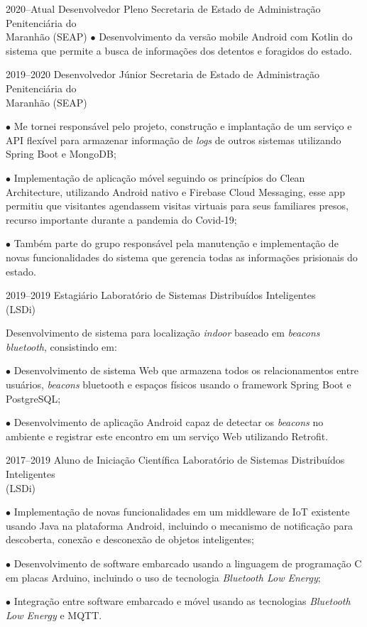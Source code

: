 \documentclass[]{../document-class/twentysecondcv}
\begin{document}
\begin{twenty}
	\twentyitem
		{2020--Atual}
		{Desenvolvedor Pleno}
		{Secretaria de Estado de Administração Penitenciária do \\\hspace*{\fill}Maranhão (SEAP)}
		{
			$\bullet$ Desenvolvimento da versão mobile Android com Kotlin do sistema que permite a busca de informações dos detentos e foragidos do estado.
		}

	\twentyitem
		{2019--2020}
		{Desenvolvedor Júnior}
		{Secretaria de Estado de Administração Penitenciária do \\\hspace*{\fill}Maranhão (SEAP)}
		{
			$\bullet$ Me tornei responsável pelo projeto, construção e implantação de um serviço e API flexível para armazenar informação de \textit{logs} de outros sistemas utilizando Spring Boot e MongoDB;\vskip 4pt 

			$\bullet$  Implementação de aplicação móvel seguindo os princípios do Clean Architecture, utilizando Android nativo e Firebase Cloud Messaging, esse app permitiu que visitantes agendassem visitas virtuais para seus familiares presos, recurso importante durante a pandemia do Covid-19;\vskip 4pt

			$\bullet$ Também parte do grupo responsável pela manutenção e implementação de novas funcionalidades do sistema que gerencia todas as informações prisionais do estado.
		}
	
	\twentyitem
		{2019--2019}
		{Estagiário}
		{Laboratório de Sistemas Distribuídos Inteligentes \\\hspace*{\fill}(LSDi)}
		{
			Desenvolvimento de sistema para localização \textit{indoor} baseado em \textit{beacons bluetooth}, consistindo em:\vskip 4pt
          
			$\bullet$ Desenvolvimento de sistema Web que armazena todos os relacionamentos entre usuários, \textit{beacons} bluetooth e espaços físicos usando o framework Spring Boot e PostgreSQL;\vskip 4pt
        
			$\bullet$ Desenvolvimento de aplicação Android capaz de detectar os \textit{beacons} no ambiente e registrar este encontro em um serviço Web utilizando Retrofit.
		}
			
	\twentyitem
		{2017--2019}
		{Aluno de Iniciação Científica}
		{Laboratório de Sistemas Distribuídos Inteligentes \\\hspace*{\fill}(LSDi)}
		{
			$\bullet$ Implementação de novas funcionalidades em um middleware de IoT existente usando Java na plataforma Android, incluindo o mecanismo de notificação para descoberta, conexão e desconexão de objetos inteligentes;\vskip 4pt

			$\bullet$ Desenvolvimento de software embarcado usando a linguagem de programação C em placas Arduino, incluindo o uso de tecnologia \textit{Bluetooth Low Energy};\vskip 4pt

			$\bullet$ Integração entre software embarcado e móvel usando as tecnologias \textit{Bluetooth Low Energy} e MQTT.
		}
\end{twenty}
\end{document}
